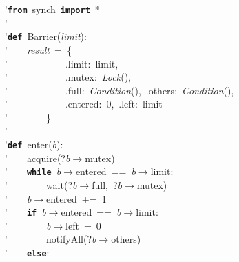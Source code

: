 \'\>\texttt{\textbf{from}}~synch~\texttt{\textbf{import}}~*\\

\'\>\\

\'\>\texttt{\textbf{def}}~Barrier(\textit{limit}):\\

\'\>~~~~\textit{result}~=~\{\\

\'\>~~~~~~~~~~~~.limit:~limit,\\

\'\>~~~~~~~~~~~~.mutex:~\textit{Lock}(),\\

\'\>~~~~~~~~~~~~.full:~\textit{Condition}(),~.others:~\textit{Condition}(),\\

\'\>~~~~~~~~~~~~.entered:~0,~.left:~limit\\

\'\>~~~~~~~~\}\\

\'\>\\

\'\>\texttt{\textbf{def}}~enter(\textit{b}):\\

\'\>~~~~acquire(?\textit{b}$\rightarrow$mutex)\\

\'\>~~~~\texttt{\textbf{while}}~\textit{b}$\rightarrow$entered~==~\textit{b}$\rightarrow$limit:\\

\'\>~~~~~~~~wait(?\textit{b}$\rightarrow$full,~?\textit{b}$\rightarrow$mutex)\\

\'\>~~~~\textit{b}$\rightarrow$entered~+=~1\\

\'\>~~~~\texttt{\textbf{if}}~\textit{b}$\rightarrow$entered~==~\textit{b}$\rightarrow$limit:\\

\'\>~~~~~~~~\textit{b}$\rightarrow$left~=~0\\

\'\>~~~~~~~~notifyAll(?\textit{b}$\rightarrow$others)\\

\'\>~~~~\texttt{\textbf{else}}:\\

